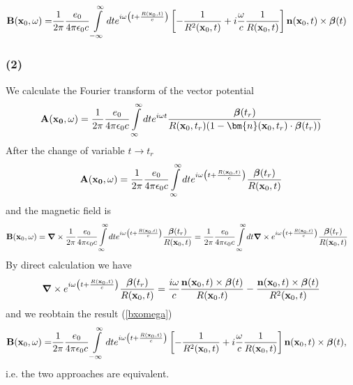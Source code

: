 \begin{align}
    {\bf B}({\bf x}_0,\omega)= & \frac1{2\pi}\frac{e_0}{4\pi\epsilon_0c}\int\limits_{-\infty}^{\infty}dt e^{i\omega \left(t+\frac{R({\bf x}_0,t)}c\right)}\left[-\frac{1}{R^2({\bf x}_0,t)}+i\frac{\omega}c\frac{1}{R({\bf x}_0,t)}\right]{\bf n}({\bf x}_0,t)\times{\boldsymbol{\beta}}(t)\label{bxomega}
\end{align}
\subsubsection{(2)}

We calculate the Fourier transform of the vector potential
\begin{align}
    {\bf A}({\bf x_0},\omega)=\frac1{2\pi}\frac{e_0}{4\pi\epsilon_0c}\int\limits_{\infty}^{\infty}dte^{i\omega t}\frac{{\boldsymbol{\beta}}(t_r)}{R({\bf x}_0,t_r)(1-{\bm{n}}({\bf x}_0,t_r)\cdot{\boldsymbol{\beta}}(t_r))}
\end{align}
After the change of variable  $t\rightarrow t_r$
\begin{align}
    {\bf A}({\bf x_0},\omega)=\frac1{2\pi}\frac{e_0}{4\pi\epsilon_0c}\int\limits_{\infty}^{\infty}dte^{i\omega \left(t+\frac{R({\bf x}_0,t)}c\right)}\frac{{\boldsymbol{\beta}}(t_r)}{R({\bf x}_0,t)}
\end{align}
and the magnetic field is
\begin{align}
    {\bf B}({\bf x}_0,\omega) & ={\boldsymbol{\nabla}}\times\frac1{2\pi}\frac{e_0}{4\pi\epsilon_0c}\int\limits_{\infty}^{\infty}dte^{i\omega \left(t+\frac{R({\bf x}_0,t)}c\right)}\frac{{\boldsymbol{\beta}}(t_r)}{R({\bf x}_0,t)} =\frac1{2\pi}\frac{e_0}{4\pi\epsilon_0c}\int\limits_{\infty}^{\infty}dt{\boldsymbol{\nabla}}\times e^{i\omega \left(t+\frac{R({\bf x}_0,t)}c\right)}\frac{{\boldsymbol{\beta}}(t_r)}{R({\bf x}_0,t)}
\end{align}
By direct calculation we have
\begin{align}
    {\boldsymbol{\nabla}}\times e^{i\omega \left(t+\frac{R({\bf x}_0,t)}c\right)}\frac{{\boldsymbol{\beta}}(t_r)}{R({\bf x}_0,t)}=\frac{i \omega}c\frac{{\bf n}({\bf x}_0,t)\times{\boldsymbol{\beta}}(t)}{R({\bf x}_0.t)}-\frac{{\bf n}({\bf x}_0,t)\times{\boldsymbol{\beta}}(t)}{R^2({\bf x}_0,t)}
\end{align}
and we reobtain the result  (\ref{bxomega})
\begin{align}
    {\bf B}({\bf x}_0,\omega)= & \frac1{2\pi}\frac{e_0}{4\pi\epsilon_0c}\int\limits_{-\infty}^{\infty}dt e^{i\omega \left(t+\frac{R({\bf x}_0,t)}c\right)}\left[-\frac{1}{R^2({\bf x}_0,t)}+i\frac{\omega}c\frac{1}{R({\bf x}_0,t)}\right]{\bf n}({\bf x}_0,t)\times{\boldsymbol{\beta}}(t),
\end{align}
i.e. the two approaches are equivalent.



